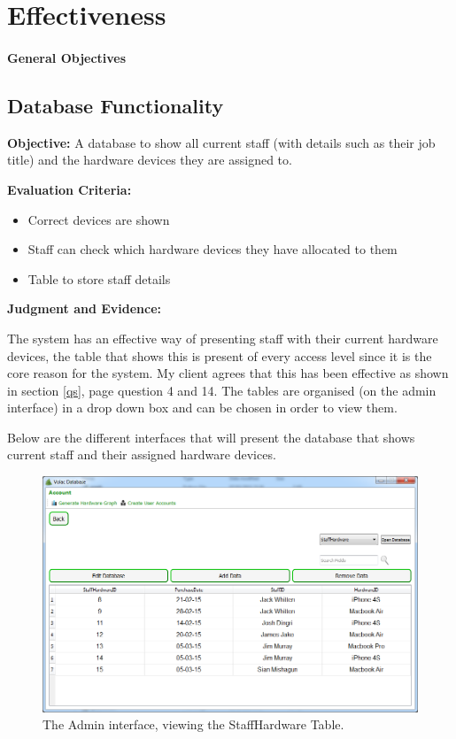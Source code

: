 \section{Effectiveness}

\paragraph{General Objectives}

\subsection{Database Functionality}\label{staffhardware}

\textbf{Objective:} A database to show all current staff (with details such as their job title) and the hardware devices they are assigned to.

\textbf{Evaluation Criteria:}
\begin{itemize}
\item{Correct devices are shown}
\item{Staff can check which hardware devices they have allocated to them}
\item{Table to store staff details}
\end{itemize}

\textbf{Judgment and Evidence:}

The system has an effective way of presenting staff with their current hardware devices, the table that shows this is present of every access level since it is the core reason for the system. My client agrees that this has been effective as shown in section \ref{qs}, page \pageref{qs} question 4 and 14. The tables are organised (on the admin interface) in a drop down box and can be chosen in order to view them.

Below are the different interfaces that will present the database that shows current staff and their assigned hardware devices.

\begin{figure}[H]
    \includegraphics[width=\textwidth]{./Evaluation/Images/Database1.png}
    \caption{The Admin interface, viewing the StaffHardware Table.} \label{fig:db1}
\end{figure}

